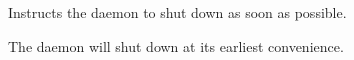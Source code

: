 
\begin{description}
Instructs the daemon to shut down as soon as possible.
\end{description}


\begin{responses}
  The daemon will shut down at its earliest convenience.
\end{responses}
